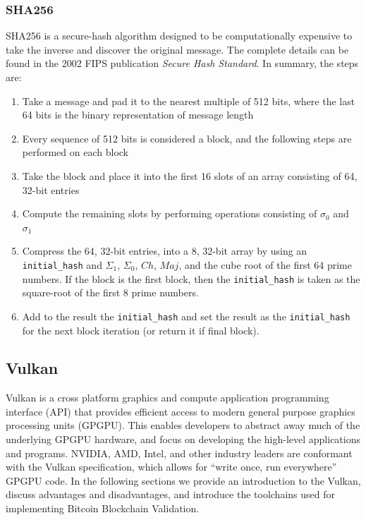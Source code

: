 \documentclass{article}
\begin{document}
\subsubsection{SHA256}

SHA256 is a secure-hash algorithm designed to be computationally expensive to take the inverse and discover the original message. The complete details can be found in the 2002 FIPS publication \textit{Secure Hash Standard}. In summary, the steps are:

\begin{enumerate}
    \item Take a message and pad it to the nearest multiple of 512 bits, where the last 64 bits is the binary representation of message length
    \item Every sequence of 512 bits is considered a block, and the following steps are performed on each block
    \item Take the block and place it into the first 16 slots of an array consisting of 64, 32-bit entries
    \item Compute the remaining slots by performing operations consisting of $\sigma_0$ and $\sigma_1$
    \item Compress the 64, 32-bit entries, into a 8, 32-bit array by using an \texttt{initial\_hash} and $\Sigma_1$, $\Sigma_0$, $Ch$, $Maj$, and the cube root of the first 64 prime numbers. If the block is the first block, then the \texttt{initial\_hash} is taken as the square-root of the first 8 prime numbers.
    \item Add to the result the \texttt{initial\_hash} and set the result as the \texttt{initial\_hash} for the next block iteration (or return it if final block).
\end{enumerate}

\subsection{Vulkan}
Vulkan is a cross platform graphics and compute application programming interface (API) that provides efficient access to modern general purpose graphics processing units (GPGPU). This enables developers to abstract away much of the underlying GPGPU hardware,  and focus on developing the high-level applications and programs. NVIDIA, AMD, Intel, and other industry leaders are conformant with the Vulkan specification, which allows for ``write once, run everywhere” GPGPU code. In the following sections we provide an introduction to the Vulkan, discuss advantages and disadvantages, and introduce the toolchains used for implementing Bitcoin Blockchain Validation.
\end{document}
